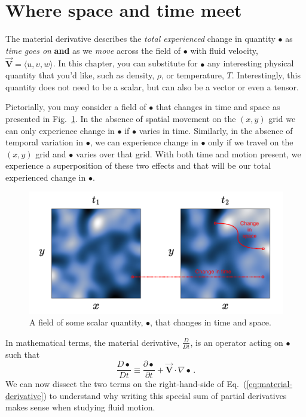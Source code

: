 \section{Where space and time meet}

The material derivative describes the \textit{total experienced} change in quantity $\bullet$ as \textit{time goes on} \textbf{and} as we \textit{move} across the field of $\bullet$ with fluid velocity, $\vec{\bm{V}} = \langle u, \upsilon, w \rangle$.
In this chapter, you can substitute for $\bullet$ any interesting physical quantity that you'd like, such as density, $\rho$, or temperature, $T$. Interestingly, this quantity does not need to be a scalar, but can also be a vector or even a tensor.

Pictorially, you may consider a field of $\bullet$ that changes in time and space as presented in Fig.~\ref{fig:material-derivative-example}. In the absence of spatial movement on the $(x,y)$ grid we can only experience change in $\bullet$ if $\bullet$ varies in time. Similarly, in the absence of temporal variation in $\bullet$, we can experience change in $\bullet$ only if we travel on the $(x,y)$ grid and $\bullet$ varies over that grid. With both time and motion present, we experience a superposition of these two effects and that will be our total experienced change in $\bullet$.
\begin{figure}[H]
\centering\includegraphics[width=15cm]{material-derivative.pdf}
\caption{A field of some scalar quantity, $\bullet$, that changes in time and space.}			
\label{fig:material-derivative-example}
\end{figure}

In mathematical terms, the material derivative, $\frac{D}{Dt}$, is an operator acting on $\bullet$ such that
\begin{equation} \label{eq:material-derivative}
\frac{D \bullet}{D t} \equiv \frac{\partial \bullet}{\partial t} + \vec{\bm{V}} \cdot \nabla \bullet \, .
\end{equation}
We can now dissect the two terms on the right-hand-side of Eq.~(\ref{eq:material-derivative}) to understand why writing this special sum of partial derivatives makes sense when studying fluid motion.

